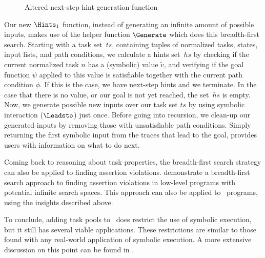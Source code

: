 \begin{figure*}
  \begin{mathpar}
  \end{mathpar}
  \caption{Altered next-step hint generation function}
  \label{fig:next-step-hints-new}
\end{figure*}

Our new $\Hints_1$ function, instead of generating an infinite amount of possible inputs,
makes use of the helper function $\Generate$ which does this breadth-first search.
Starting with a task set~$ts$, containing tuples of normalized tasks, states, input lists, and path conditions,
we calculate a hints set~$hs$ by checking if the current normalized task $n$ has a (symbolic) value $\tilde{v}$,
and verifying if the goal function $\psi$ applied to this value is satisfiable together with the current path condition $\phi$.
If this is the case, we have next-step hints and we terminate.
In the case that there is no value, or our goal is not yet reached,
the set~$hs$ is empty.
Now, we generate possible new inputs over our task set $ts$ by using symbolic interaction ($\Leadsto$) just once.
Before going into recursion, we clean-up our generated inputs by removing those with unsatisfiable path conditions.
Simply returning the first symbolic input from the traces that lead to the goal, provides users with information on what to do next.

Coming back to reasoning about task properties, the breadth-first search strategy can also be applied to finding assertion violations.
\citet{conf/tap/NausVSR23} demonstrate a breadth-first search approach to finding assertion violations in low-level programs with potential infinite search spaces.
This approach can also be applied to \DYNTOPHAT\ programs, using the insights described above.

To conclude, adding task pools to \TOPHAT\ does restrict the use of symbolic execution, but it still has several viable applications.
These restrictions are similar to those found with any real-world application of symbolic execution.
A more extensive discussion on this point can be found in \citet{conf/ifl/NausSK19}.